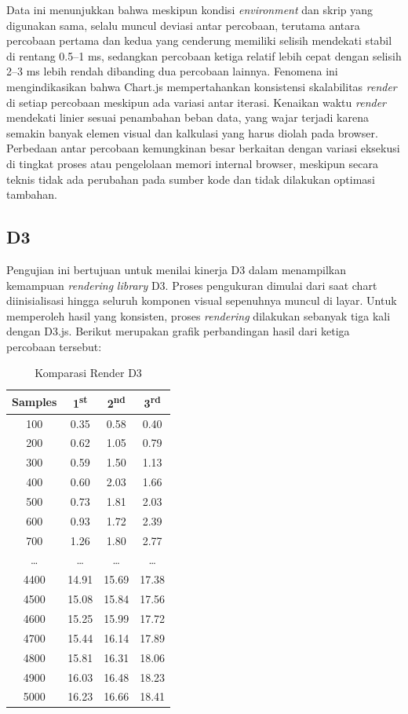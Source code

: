 Data ini menunjukkan bahwa meskipun kondisi \textit{environment} dan skrip yang digunakan sama, selalu muncul deviasi antar percobaan, terutama antara percobaan pertama dan kedua yang cenderung memiliki selisih mendekati stabil di rentang 0.5–1 ms, sedangkan percobaan ketiga relatif lebih cepat dengan selisih 2–3 ms lebih rendah dibanding dua percobaan lainnya. Fenomena ini mengindikasikan bahwa Chart.js mempertahankan konsistensi skalabilitas \textit{render} di setiap percobaan meskipun ada variasi antar iterasi. Kenaikan waktu \textit{render} mendekati linier sesuai penambahan beban data, yang wajar terjadi karena semakin banyak elemen visual dan kalkulasi yang harus diolah pada browser. Perbedaan antar percobaan kemungkinan besar berkaitan dengan variasi eksekusi di tingkat proses atau pengelolaan memori internal browser, meskipun secara teknis tidak ada perubahan pada sumber kode dan tidak dilakukan optimasi tambahan.

\subsection{D3}
Pengujian ini bertujuan untuk menilai kinerja D3 dalam menampilkan kemampuan \textit{rendering} \textit{library} D3. Proses pengukuran dimulai dari saat chart diinisialisasi hingga seluruh komponen visual sepenuhnya muncul di layar. Untuk memperoleh hasil yang konsisten, proses \textit{rendering} dilakukan sebanyak tiga kali dengan D3.js. Berikut merupakan grafik perbandingan hasil dari ketiga percobaan tersebut:

\begin{table}[H]
	\centering
	\caption{Komparasi Render D3}
	\label{Komparasi Render D3}
	\renewcommand{\arraystretch}{1.2}
	\begin{tabular}{|c|c|c|c|}
		\hline
		\textbf{Samples} & \textbf{1\textsuperscript{st}} & \textbf{2\textsuperscript{nd}} & \textbf{3\textsuperscript{rd}} \\
		\hline
		100  & 0.35 & 0.58 & 0.40 \\
		200  & 0.62 & 1.05 & 0.79 \\
		300  & 0.59 & 1.50 & 1.13 \\
		400  & 0.60 & 2.03 & 1.66 \\
		500  & 0.73 & 1.81 & 2.03 \\
		600  & 0.93 & 1.72 & 2.39 \\
		700  & 1.26 & 1.80 & 2.77 \\
		\ldots & \ldots & \ldots & \ldots \\
		4400 & 14.91 & 15.69 & 17.38 \\
		4500 & 15.08 & 15.84 & 17.56 \\
		4600 & 15.25 & 15.99 & 17.72 \\
		4700 & 15.44 & 16.14 & 17.89 \\
		4800 & 15.81 & 16.31 & 18.06 \\
		4900 & 16.03 & 16.48 & 18.23 \\
		5000 & 16.23 & 16.66 & 18.41 \\
		\hline
	\end{tabular}
\end{table}

